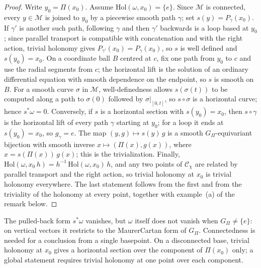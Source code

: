     \begin{proof}
      Write $y_0 = \Pi(x_0)$.
      Assume $\mathrm{Hol}(\omega, x_0) = \{e\}$.
      Since $\mathcal{M}$ is connected, every $y \in \mathcal{M}$ is joined to $y_0$ by a piecewise smooth path
      $\gamma$; set $s(y) = P_\gamma(x_0)$.
      If $\gamma'$ is another such path, following $\gamma$ and then $\gamma'$ backwards is a loop based at
      $y_0$; since parallel transport is compatible with concatenation and with the right action, trivial
      holonomy gives $P_{\gamma'}(x_0) = P_\gamma(x_0)$, so $s$ is well defined and $s(y_0) = x_0$.
      On a coordinate ball $B$ centred at $c$, fix one path from $y_0$ to $c$ and use the radial segments from
      $c$; the horizontal lift is the solution of an ordinary differential equation with smooth dependence on
      the endpoint, so $s$ is smooth on $B$.
      For a smooth curve $\sigma$ in $\mathcal{M}$, well-definedness allows $s(\sigma(t))$ to be computed along
      a path to $\sigma(0)$ followed by $\sigma|_{[0,t]}$, so $s \circ \sigma$ is a horizontal curve; hence
      $s^*\omega = 0$.
      Conversely, if $s$ is a horizontal section with $s(y_0) = x_0$, then $s \circ \gamma$ is the horizontal lift
      of every path $\gamma$ starting at $y_0$; for a loop it ends at $s(y_0) = x_0$, so $g_\gamma = e$.
      The map $(y, g) \mapsto s(y)\, g$ is a smooth $G_\Pi$-equivariant bijection with smooth inverse
      $x \mapsto (\Pi(x), g(x))$, where $x = s(\Pi(x))\, g(x)$; this is the trivialization.
      Finally, $\mathrm{Hol}(\omega, x_0\, h) = h^{-1}\,\mathrm{Hol}(\omega, x_0)\, h$, and any two points of
      $\mathcal{C}_\chi$ are related by parallel transport and the right action, so trivial holonomy at $x_0$ is
      trivial holonomy everywhere.
      The last statement follows from the first and from the triviality of the holonomy at every point,
      together with example~(a) of the remark below.
    \end{proof}

    The pulled-back form $s^*\omega$ vanishes, but $\omega$ itself does not vanish when $G_\Pi \neq \{e\}$:
    on vertical vectors it restricts to the Maurer\textendash Cartan form of $G_\Pi$.
    Connectedness is needed for a conclusion from a single basepoint.
    On a disconnected base, trivial holonomy at $x_0$ gives a horizontal section over the component of $\Pi(x_0)$
    only; a global statement requires trivial holonomy at one point over each component.

